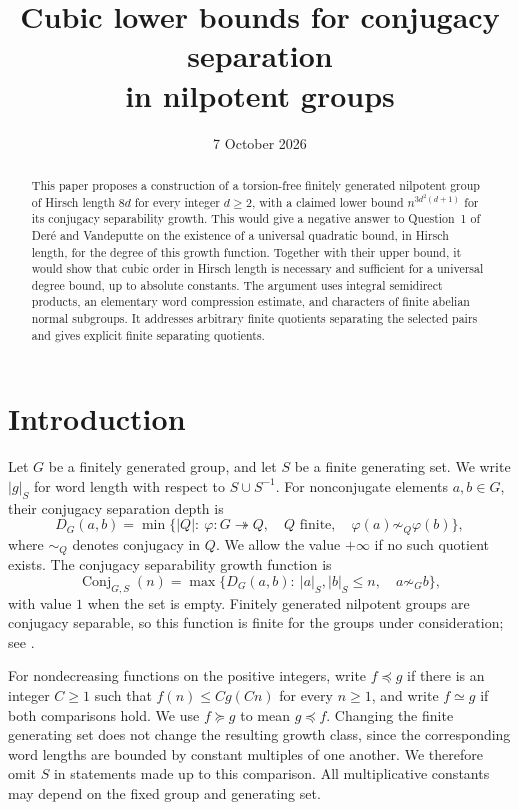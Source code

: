 \documentclass[11pt,letterpaper]{amsart}
\title[Cubic lower bounds for conjugacy separation]{Cubic lower bounds for conjugacy separation\\in nilpotent groups}
\author{}
\date{7 October 2026}
\numberwithin{equation}{section}
\theoremstyle{remark}
\newcommand{\Conj}{\operatorname{Conj}}
\begin{document}
\begin{abstract}
This paper proposes a construction of a torsion-free finitely generated
nilpotent group of Hirsch length $8d$ for every integer $d\ge2$, with
a claimed lower bound $n^{3d^2(d+1)}$ for its conjugacy separability
growth. This would give a negative answer to Question~1
of Der\'e and Vandeputte on the existence of a universal quadratic
bound, in Hirsch length, for the degree of this growth function.
Together with their upper bound, it would show that cubic order in
Hirsch length is necessary and sufficient for a universal degree
bound, up to absolute constants. The argument uses integral
semidirect products, an elementary word compression estimate, and
characters of finite abelian normal subgroups. It addresses arbitrary
finite quotients separating the selected pairs and gives explicit
finite separating quotients.
\end{abstract}
\maketitle

\section{Introduction}

Let $G$ be a finitely generated group, and let $S$ be a finite generating
set. We write $|g|_S$ for word length with respect to $S\cup S^{-1}$.
For nonconjugate elements $a,b\in G$, their conjugacy separation depth is
\[
 D_G(a,b)=\min\bigl\{|Q|:\ \varphi:G\twoheadrightarrow Q,\quad
 Q\text{ finite},\quad \varphi(a)\not\sim_Q\varphi(b)\bigr\},
\]
where $\sim_Q$ denotes conjugacy in $Q$. We allow the value $+\infty$
if no such quotient exists. The conjugacy separability growth function is
\[
 \Conj_{G,S}(n)=\max\bigl\{D_G(a,b):\ |a|_S,|b|_S\le n,
 \quad a\not\sim_G b\bigr\},
\]
with value $1$ when the set is empty. Finitely generated nilpotent groups
are conjugacy separable, so this function is finite for the groups under
consideration; see \cite[Introduction]{DV}.

For nondecreasing functions on the positive integers, write $f\preceq g$
if there is an integer $C\ge1$ such that $f(n)\le Cg(Cn)$ for every
$n\ge1$, and write $f\simeq g$ if both comparisons hold. We use
$f\succeq g$ to mean $g\preceq f$. Changing the finite generating set
does not change the resulting growth class, since the corresponding word
lengths are bounded by constant multiples of one another. We therefore
omit $S$ in statements made up to this comparison. All multiplicative
constants may depend on the fixed group and generating set.
\end{document}
